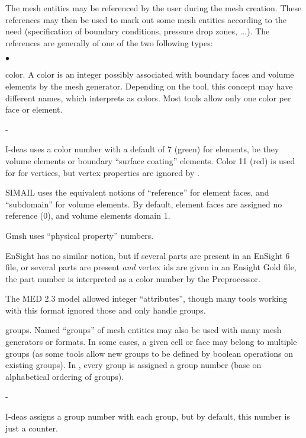 {{{{The mesh entities may be referenced by the user during the mesh
creation. These references may then be used to mark out some mesh entities
according to the need (specification of boundary conditions, pressure
drop zones, ...). The references are generally of one of the two
following types:
\begin{list}{$\bullet$}{}
\item color.
A color is an integer possibly associated with boundary faces and
volume elements by the mesh generator. Depending on the tool,
this concept may have different names, which \CS interprets
as colors. Most tools allow only one color per face or element.
      \begin{list}{-}{}
      \item I-deas uses a color number with a default of
            7 (green) for elements, be they volume elements or boundary
            ``surface coating'' elements. Color 11 (red) is used for
            for vertices, but vertex properties are ignored by \CS.
      \item SIMAIL uses the equivalent notions of ``reference''
            for element faces, and ``subdomain'' for volume elements.
            By default, element faces are assigned no reference (0),
            and volume elements domain 1.
      \item Gmsh uses ``physical property'' numbers.
      \item EnSight has no similar notion, but if several parts
            are present in an EnSight 6 file, or several parts
            are present \emph{and} vertex ids are given in an
            Ensight Gold file, the part number is interpreted as
            a color number by the Preprocessor.
      \item The MED 2.3 model allowed integer ``attributes'', though
            many tools working with this format ignored those
            and only handle groups.
      \end{list}
\item groups.
Named ``groups'' of mesh entities may also be used with many
mesh generators or formats. In some cases, a given cell or face may belong
to multiple groups (as some tools allow new groups to be defined
by boolean operations on existing groups).
In \CS, every group is assigned a group number (base on alphabetical
ordering of groups).
      \begin{list}{-}{}
      \item I-deas assigns a group number with each
            group, but by default, this number is just a counter.

\end{list}
\end{list}}}}}
